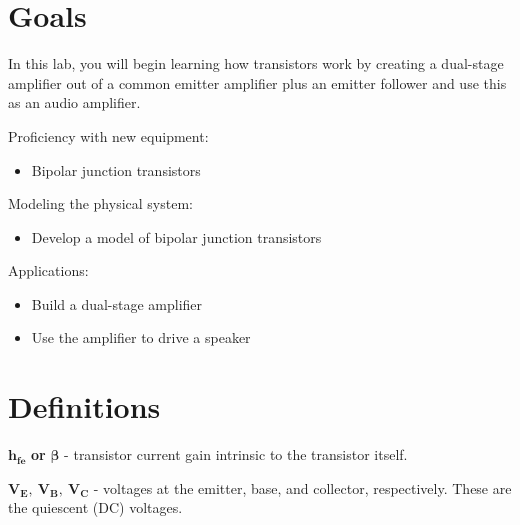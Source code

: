 \documentclass[10pt]{PhysLab1C} %
\begin{document}
\maketitle %


\thispagestyle{firstpage} %


\section{Goals}
In this lab, you will begin learning how transistors work by creating a dual-stage amplifier out of a common
emitter amplifier plus an emitter follower and use this as an audio amplifier.

Proficiency with new equipment:

\begin{itemize}
\item
  Bipolar junction transistors
\end{itemize}

Modeling the physical system:

\begin{itemize}
\item
  Develop a model of bipolar junction transistors
\end{itemize}

Applications:

\begin{itemize}
\item
  Build a dual-stage amplifier
\item
 Use the amplifier to drive a speaker
\end{itemize}



\section{Definitions}

$\mathbf{h_{fe}}$ \textbf{or} $\bm{\beta}$ - transistor current gain intrinsic to the transistor itself.

$\mathbf{V_{E},~V_{B},~V_{C}}$ - voltages at the emitter, base, and collector, respectively. These are the quiescent (DC) voltages.
\end{document}
